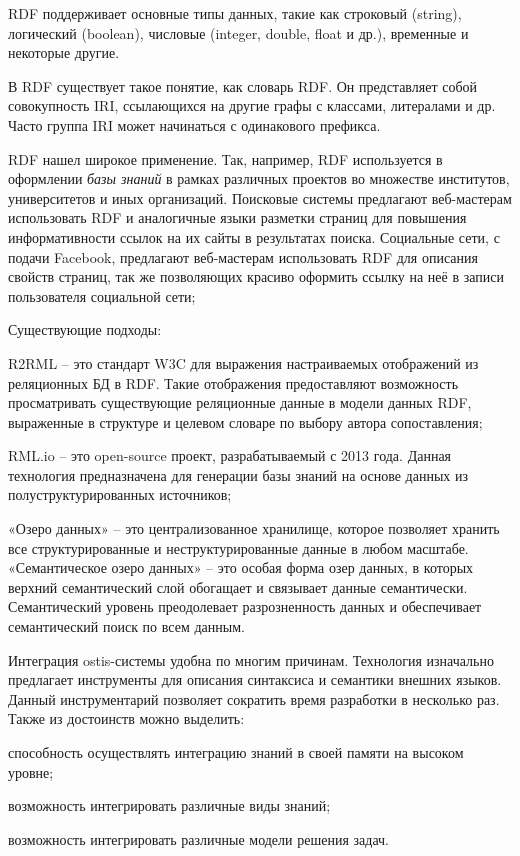 RDF поддерживает основные типы данных, такие как строковый (string), логический (boolean), числовые (integer, double, float и др.), временные и некоторые другие.

В RDF существует такое понятие, как словарь RDF. Он представляет собой совокупность IRI, ссылающихся на другие графы с классами, литералами и др. Часто группа IRI может начинаться с одинакового префикса.

RDF нашел широкое применение. Так, например, RDF используется в оформлении \textit{базы знаний} в рамках различных проектов во множестве институтов, университетов и иных организаций. Поисковые системы предлагают веб-мастерам использовать RDF и аналогичные языки разметки страниц для повышения информативности ссылок на их сайты в результатах поиска. Социальные сети, с подачи Facebook, предлагают веб-мастерам использовать RDF для описания свойств страниц, так же позволяющих красиво оформить ссылку на неё в записи пользователя социальной сети;

Существующие подходы:
\begin{textitemize}
    \item R2RML – это стандарт W3C для выражения настраиваемых отображений из реляционных БД в RDF. Такие отображения предоставляют возможность просматривать существующие реляционные данные в модели данных RDF, выраженные в структуре и целевом словаре по выбору автора сопоставления;
    \item RML.io – это open-source проект, разрабатываемый с 2013 года. Данная технология предназначена для генерации базы знаний на основе данных из полуструктурированных источников;
    \item «Озеро данных» – это централизованное хранилище, которое позволяет хранить все структурированные и неструктурированные данные в любом масштабе. «Семантическое озеро данных» – это особая форма озер данных, в которых верхний семантический слой обогащает и связывает данные семантически. Семантический уровень преодолевает разрозненность данных и обеспечивает семантический поиск по всем данным.
\end{textitemize}

Интеграция ostis-системы удобна по многим причинам. Технология изначально предлагает инструменты для описания синтаксиса и семантики внешних языков. Данный инструментарий позволяет сократить время разработки в несколько раз. Также из достоинств можно выделить:
\begin{textitemize}
    \item способность осуществлять интеграцию знаний в своей памяти на высоком уровне;
    \item возможность интегрировать различные виды знаний;
    \item возможность интегрировать различные модели решения задач.
\end{textitemize}

